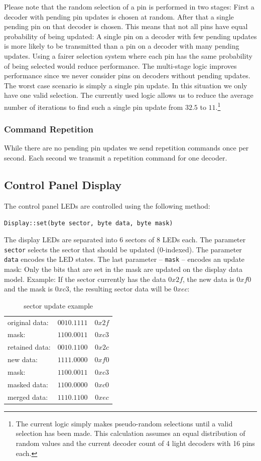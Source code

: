 \documentclass{scrreprt}
\newcommand{\code}[1]{\texttt{#1}}
\begin{document}
Please note that the random selection of a pin is performed in two stages:
First a decoder with pending pin updates is chosen at random.
After that a single pending pin on that decoder is chosen.
This means that not all pins have equal probability of being updated:
A single pin on a decoder with few pending updates is more likely to be transmitted than a pin on a decoder with many pending updates.
Using a fairer selection system where each pin has the same probability of being selected would reduce performance.
The multi-stage logic improves performance since we never consider pins on decoders without pending updates.
The worst case scenario is simply a single pin update.
In this situation we only have one valid selection.
The currently used logic allows us to reduce the average number of iterations to find such a single pin update from $32.5$ to $11$.\footnote{The current logic simply makes pseudo-random selections until a valid selection has been made. This calculation assumes an equal distribution of random values and the current decoder count of 4 light decoders with 16 pins each.}

\subsubsection{Command Repetition}
While there are no pending pin updates we send repetition commands once per second.
Each second we transmit a repetition command for one decoder.

\newpage
\subsection{Control Panel Display}
The control panel LEDs are controlled using the following method:

\code{Display::set(byte sector, byte data, byte mask)}

The display LEDs are separated into 6 sectors of 8 LEDs each.
The parameter \code{sector} selects the sector that should be updated (0-indexed).
The parameter \code{data} encodes the LED states.
The last parameter -- \code{mask} -- encodes an update mask:
Only the bits that are set in the mask are updated on the display data model.
Example:
If the sector currently has the data $0x2f$, the new data is $0xf0$ and the mask is $0xc3$, the resulting sector data will be $0xec$:

\begin{table}[ht!]
\centering
\begin{tabular}{ | l | c | c |}
\hline
original data: 	& $0010.1111$ & $0x2f$ \\
mask:				& $1100.0011$ & $0xc3$ \\\hline
retained data:  & $0010.1100$ & $0x2c$ \\\hline\hline
new data: 		& $1111.0000$ & $0xf0$ \\
mask:				& $1100.0011$ & $0xc3$ \\\hline
masked data:		& $1100.0000$ & $0xc0$ \\\hline\hline
merged data:    & $1110.1100$ & $0xec$ \\\hline
\end{tabular}
\caption{sector update example}
\end{table}
\end{document}
